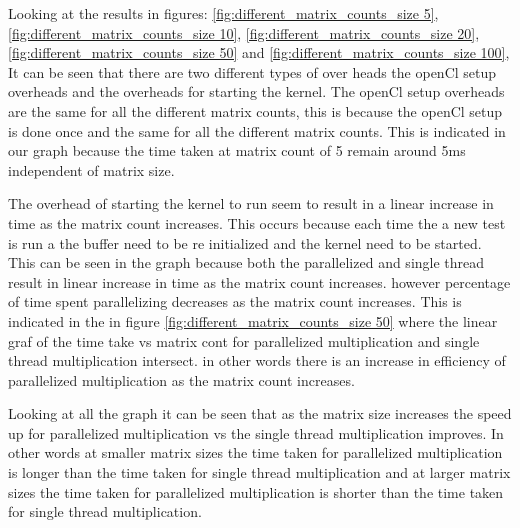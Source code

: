 Looking at the results in figures: \ref{fig:different_matrix_counts_size 5}, \ref{fig:different_matrix_counts_size 10}, \ref{fig:different_matrix_counts_size 20}, \ref{fig:different_matrix_counts_size 50} and \ref{fig:different_matrix_counts_size 100},
It can be seen that there are two different types of over heads the openCl setup overheads and the overheads for starting the kernel.
The openCl setup overheads are the same for all the different matrix counts, this is because the openCl setup is done once and the same for all the different matrix counts.
This is indicated in our graph because the time taken at matrix count of 5 remain around 5ms independent of matrix size.

The overhead of starting the kernel to run seem to result in a linear increase in time  as the matrix count increases.
This occurs because each time the a new test is run a the buffer need to be re initialized and the kernel need to be started.
This can be seen in the graph because both the parallelized and single thread  result in linear increase in time as the matrix count increases.
however percentage of time spent parallelizing decreases as the matrix count increases.
This is indicated in the in figure \ref{fig:different_matrix_counts_size 50} where the linear graf of the time take vs matrix cont for parallelized multiplication
and single thread multiplication intersect. in other words there is an increase in efficiency of parallelized multiplication as the matrix count increases.

Looking at all the graph it can be seen that as the matrix size increases the speed up for parallelized multiplication vs the single thread multiplication improves.
In other words at smaller matrix sizes the time taken for parallelized multiplication is longer than the time taken for single thread multiplication
and at larger matrix sizes the time taken for parallelized multiplication is shorter than the time taken for single thread multiplication.




